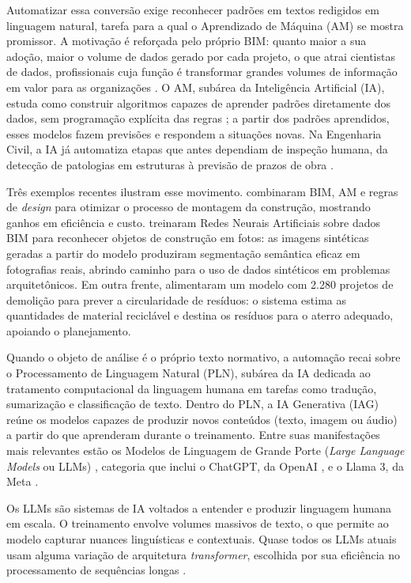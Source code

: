 Automatizar essa conversão exige reconhecer padrões em textos redigidos em linguagem natural, tarefa para a qual o Aprendizado de Máquina (AM) se mostra promissor. A motivação é reforçada pelo próprio BIM: quanto maior a sua adoção, maior o volume de dados gerado por cada projeto, o que atrai cientistas de dados, profissionais cuja função é transformar grandes volumes de informação em valor para as organizações \cite{davenport2012}. O AM, subárea da Inteligência Artificial (IA), estuda como construir algoritmos capazes de aprender padrões diretamente dos dados, sem programação explícita das regras \cite{tan2006}; a partir dos padrões aprendidos, esses modelos fazem previsões e respondem a situações novas. Na Engenharia Civil, a IA já automatiza etapas que antes dependiam de inspeção humana, da detecção de patologias em estruturas à previsão de prazos de obra \cite{rane2023,liu2022}.

Três exemplos recentes ilustram esse movimento.  combinaram BIM, AM e regras de \textit{design} para otimizar o processo de montagem da construção, mostrando ganhos em eficiência e custo.  treinaram Redes Neurais Artificiais sobre dados BIM para reconhecer objetos de construção em fotos: as imagens sintéticas geradas a partir do modelo produziram segmentação semântica eficaz em fotografias reais, abrindo caminho para o uso de dados sintéticos em problemas arquitetônicos. Em outra frente,  alimentaram um modelo com 2.280 projetos de demolição para prever a circularidade de resíduos: o sistema estima as quantidades de material reciclável e destina os resíduos para o aterro adequado, apoiando o planejamento.

Quando o objeto de análise é o próprio texto normativo, a automação recai sobre o Processamento de Linguagem Natural (PLN), subárea da IA dedicada ao tratamento computacional da linguagem humana em tarefas como tradução, sumarização e classificação de texto. Dentro do PLN, a IA Generativa (IAG) reúne os modelos capazes de produzir novos conteúdos (texto, imagem ou áudio) a partir do que aprenderam durante o treinamento. Entre suas manifestações mais relevantes estão os Modelos de Linguagem de Grande Porte (\textit{Large Language Models} ou LLMs) \cite{zhao2023}, categoria que inclui o ChatGPT, da OpenAI \cite{openai2024}, e o Llama 3, da Meta \cite{llama3}.

Os LLMs são sistemas de IA voltados a entender e produzir linguagem humana em escala. O treinamento envolve volumes massivos de texto, o que permite ao modelo capturar nuances linguísticas e contextuais. Quase todos os LLMs atuais usam alguma variação de arquitetura \textit{transformer}, escolhida por sua eficiência no processamento de sequências longas \cite{zhao2023}.

